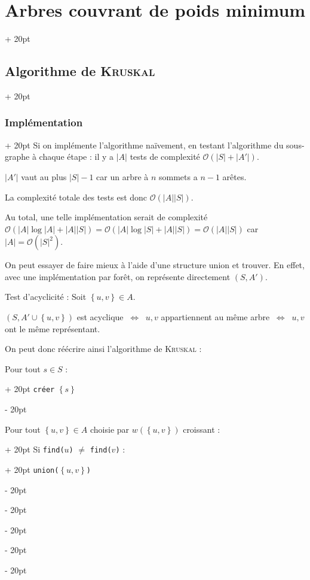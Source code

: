 \documentclass[a4paper, 12pt, twoside]{article}
\newcommand{\set}[1]{\left\{ #1 \right\}}
\newcommand{\abs}[1]{\left\lvert #1 \right\rvert}
\newcommand{\ssi}{\ \Leftrightarrow \ }
\newcommand{\ind}[1][20pt]{\advance\leftskip + #1}
\newcommand{\deind}[1][20pt]{\advance\leftskip - #1}
\newenvironment{indt}[2][20pt]{#2 \par \ind[#1]}{\par \deind} %
\begin{document}
\begin{indt}{\section{Arbres couvrant de poids minimum}}
\begin{indt}{\subsection{Algorithme de \textsc{Kruskal}}}
\begin{indt}{\subsubsection{Implémentation}}
                Si on implémente l'algorithme naïvement, en testant l'algorithme du sous-graphe à chaque étape : il y a $\abs A$ tests de complexité $\mathcal O(\abs S + \abs{A'})$.

                $\abs{A'}$ vaut au plus $\abs S - 1$ car un arbre à $n$ sommets a $n - 1$ arêtes.

                La complexité totale des tests est donc $\mathcal O(\abs A \abs S)$.

                Au total, une telle implémentation serait de complexité $\mathcal O(\abs A \log \abs A + \abs A \abs S) = \mathcal O(\abs A \log \abs S + \abs A \abs S) = \mathcal O(\abs A \abs S)$ car $\abs A = \mathcal O(\abs S ^2)$.

                \vspace{12pt}
                
                On peut essayer de faire mieux à l'aide d'une structure union et trouver.
                En effet, avec une implémentation par forêt, on représente directement $(S, A')$.

                Test d'acyclicité : Soit $\set{u, v} \in A$.

                $(S, A' \cup \set{u, v})$ est acyclique $\ssi$ $u, v$ appartiennent au même arbre $\ssi$ $u, v$ ont le même représentant.

                \vspace{6pt}
                
                On peut donc réécrire ainsi l'algorithme de \textsc{Kruskal} :

                \begin{pseudocode}
                    \begin{indt}{Pour tout $s \in S$ :}
                        \texttt{créer} $\set s$
                    \end{indt}

                    \vspace{6pt}
                    
                    \begin{indt}{Pour tout $\set{u, v} \in A$ choisie par $w(\set{u, v})$ croissant :}
                        \begin{indt}{Si \texttt{find($u$)} $\neq$ \texttt{find($v$)} :}
                            \texttt{union($\set{u ,v}$)}
                        \end{indt}
                    \end{indt}


\end{pseudocode}
\end{indt}
\end{indt}
\end{indt}
\end{document}
